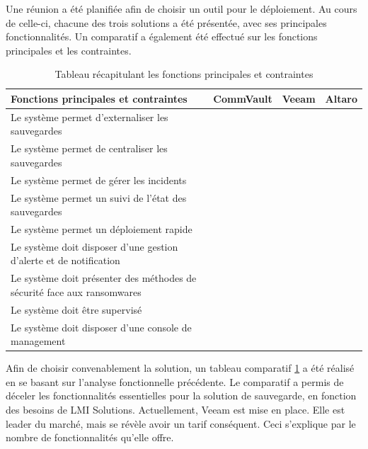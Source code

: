 \documentclass[pfe]{tnreport} %
\newcommand{\cmark}{\ding{51}}%
\newcommand{\xmark}{\ding{55}}%
\begin{document}
Une réunion a été planifiée afin de choisir un outil pour le déploiement. \newline
Au cours de celle-ci, chacune des trois solutions a été présentée, avec ses principales fonctionnalités. \newline
Un comparatif a également été effectué sur les fonctions principales et les contraintes. \newline
\begin{table}[!h]
 \centering
 \begin{tabular}{|p{7cm}|p{2cm}|p{2cm}|p{2cm}|}
 \hline Fonctions principales et contraintes & CommVault & Veeam & Altaro \\
 \hline Le système permet d'externaliser les sauvegardes & \cmark & \cmark & \cmark \\
 \hline Le système permet de centraliser les sauvegardes & \cmark & \cmark & \cmark\\
 \hline Le système permet de gérer les incidents & \cmark & \cmark & \cmark \\
 \hline Le système permet un suivi de l'état des sauvegardes & \cmark & \cmark & \cmark\\
 \hline Le système permet un déploiement rapide & \xmark & \xmark & \cmark \\
 \hline Le système doit disposer d'une gestion d'alerte et de notification & \cmark & \cmark & \cmark \\
 \hline Le système doit présenter des méthodes de sécurité face aux ransomwares & \xmark & \cmark & \cmark \\
 \hline Le système doit être supervisé & \cmark & \xmark & \cmark \\
 \hline Le système doit disposer d'une console de management & \xmark & \xmark & \cmark \\
 \hline
 \end{tabular}
 \caption{Tableau récapitulant les fonctions principales et contraintes}
 \label{tab:comparatif_Fonction}
\end{table}
\newline Afin de choisir convenablement la solution, un tableau comparatif \ref{tab:comparatif_Fonction} a été réalisé en se basant sur l'analyse fonctionnelle précédente. \newline
Le comparatif a permis de déceler les fonctionnalités essentielles pour la solution de sauvegarde, en fonction des besoins de LMI Solutions. 
Actuellement, Veeam est mise en place. Elle est leader du marché, mais se révèle avoir un tarif conséquent. \newline Ceci s'explique par le nombre de fonctionnalités qu'elle offre. 
\end{document}
